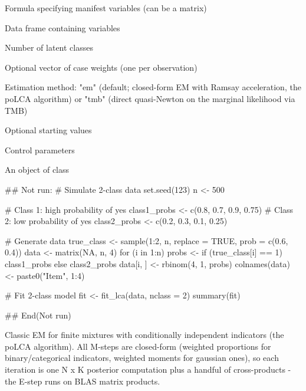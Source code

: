 \documentclass[a4paper]{book}
\begin{document}
%
\begin{Arguments}
\begin{ldescription}
\item[\code{formula}] Formula specifying manifest variables (can be a matrix)

\item[\code{data}] Data frame containing variables

\item[\code{nclass}] Number of latent classes

\item[\code{weights}] Optional vector of case weights (one per observation)

\item[\code{method}] Estimation method: "em" (default; closed-form EM with
Ramsay acceleration, the poLCA algorithm) or "tmb" (direct
quasi-Newton on the marginal likelihood via TMB)

\item[\code{start}] Optional starting values

\item[\code{control}] Control parameters
\end{ldescription}
\end{Arguments}
%
\begin{Value}
An object of class 
\end{Value}
%
\begin{Examples}
\begin{ExampleCode}
## Not run: 
# Simulate 2-class data
set.seed(123)
n <- 500

# Class 1: high probability of yes
class1_probs <- c(0.8, 0.7, 0.9, 0.75)
# Class 2: low probability of yes
class2_probs <- c(0.2, 0.3, 0.1, 0.25)

# Generate data
true_class <- sample(1:2, n, replace = TRUE, prob = c(0.6, 0.4))
data <- matrix(NA, n, 4)
for (i in 1:n) {
  probs <- if (true_class[i] == 1) class1_probs else class2_probs
  data[i, ] <- rbinom(4, 1, probs)
}
colnames(data) <- paste0("Item", 1:4)

# Fit 2-class model
fit <- fit_lca(data, nclass = 2)
summary(fit)

## End(Not run)

\end{ExampleCode}
\end{Examples}
%
\begin{Description}
Classic EM for finite mixtures with conditionally independent indicators
(the poLCA algorithm). All M-steps are closed-form (weighted proportions
for binary/categorical indicators, weighted moments for gaussian ones),
so each iteration is one N x K posterior computation plus a handful of
cross-products - the E-step runs on BLAS matrix products.
\end{Description}
\end{document}
